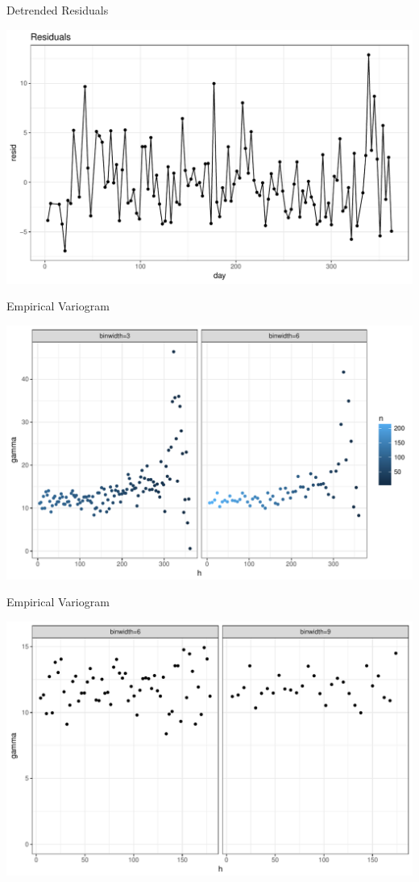 \documentclass[11pt,ignorenonframetext,]{beamer}
\begin{document}
\begin{frame}{Detrended Residuals}

\includegraphics{Lec13_files/figure-beamer/unnamed-chunk-13-1.pdf}

\end{frame}

\begin{frame}{Empirical Variogram}

\includegraphics{Lec13_files/figure-beamer/unnamed-chunk-14-1.pdf}

\end{frame}

\begin{frame}{Empirical Variogram}

\includegraphics{Lec13_files/figure-beamer/unnamed-chunk-15-1.pdf}

\end{frame}
\end{document}
